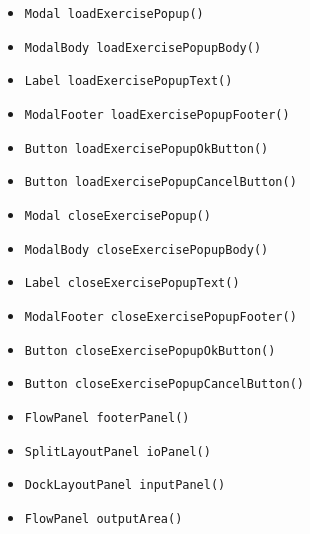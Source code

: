 \begin{itemize}
\item \texttt{Modal loadExercisePopup()}



\item \texttt{ModalBody loadExercisePopupBody()}



\item \texttt{Label loadExercisePopupText()}



\item \texttt{ModalFooter loadExercisePopupFooter()}



\item \texttt{Button loadExercisePopupOkButton()}



\item \texttt{Button loadExercisePopupCancelButton()}



\item \texttt{Modal closeExercisePopup()}



\item \texttt{ModalBody closeExercisePopupBody()}



\item \texttt{Label closeExercisePopupText()}



\item \texttt{ModalFooter closeExercisePopupFooter()}



\item \texttt{Button closeExercisePopupOkButton()}



\item \texttt{Button closeExercisePopupCancelButton()}



\item \texttt{FlowPanel footerPanel()}



\item \texttt{SplitLayoutPanel ioPanel()}



\item \texttt{DockLayoutPanel inputPanel()}



\item \texttt{FlowPanel outputArea()}




\end{itemize}
